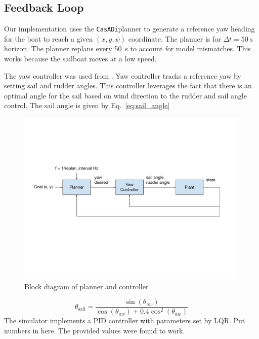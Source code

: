 \documentclass[conference]{IEEEtran}
\newcommand{\Casadi}{\lstinline{CasADi}}
\begin{document}
\subsection{Feedback Loop}
Our implementation uses the \Casadi planner to generate a reference yaw heading for the boat to reach a given \((x,y, \psi)\) coordinate. The planner is for 
\(\Delta t = \SI{50}{\second}\) 
horizon. The planner replans every \SI{50}{\second} to account for model mismatches. This works because the sailboat moves at a low speed.

The yaw controller was used from \cite{Buehler2018}.
Yaw controller tracks a reference yaw by setting sail and rudder angles.
This controller leverages the fact that there is an optimal angle for the sail based on wind direction to  the rudder and sail angle control. The sail angle is given by Eq.~\ref{eq:sail_angle}

\begin{figure}
    \centering
    \includegraphics[trim={1cm 7cm 2cm 5cm},clip]{documents/final_pres_figs/controller_block_diagram.pdf}
    \caption{Block diagram of planner and controller}
    \label{fig:controller_block_diagram}
\end{figure}

\begin{equation}
    \theta_{\text{sail}} = \frac{\sin(\theta_{aw})}{\cos(\theta_{aw}) + 0.4\cos^2(\theta_{aw})}
    \label{eq:sail_angle}
\end{equation}
The simulator implements a PID controller with parameters set by LQR. Put numbers in here. The provided values were found to work.
\end{document}
